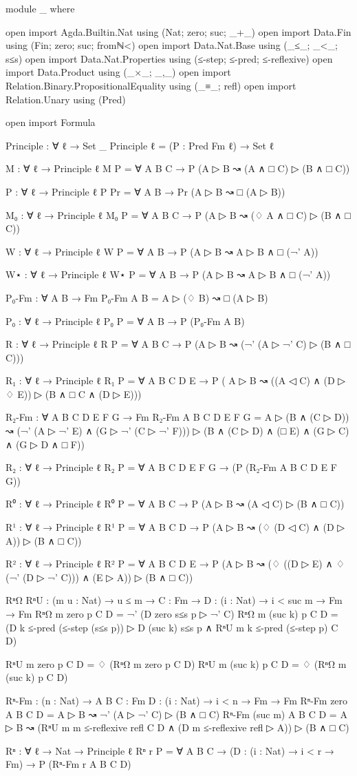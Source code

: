\begin{spverbatim}
module _ where

open import Agda.Builtin.Nat using (Nat; zero; suc; _+_)
open import Data.Fin using (Fin; zero; suc; fromℕ<)
open import Data.Nat.Base using (_≤_; _<_; s≤s)
open import Data.Nat.Properties using (≤-step; ≤-pred; ≤-reflexive)
open import Data.Product using (_×_; _,_)
open import Relation.Binary.PropositionalEquality using (_≡_; refl)
open import Relation.Unary using (Pred)

open import Formula

Principle : ∀ ℓ → Set _
Principle ℓ = (P : Pred Fm ℓ) → Set ℓ

M : ∀ {ℓ} → Principle ℓ
M P = ∀ {A B C} → P (A ▷ B ↝ (A ∧ □ C) ▷ (B ∧ □ C))

P : ∀ {ℓ} → Principle ℓ
P Pr = ∀ {A B} → Pr (A ▷ B ↝ □ (A ▷ B))

M₀ : ∀ {ℓ} → Principle ℓ
M₀ P = ∀ {A B C} → P (A ▷ B ↝ (♢ A ∧ □ C) ▷ (B ∧ □ C))

W : ∀ {ℓ} → Principle ℓ
W P = ∀ {A B} → P (A ▷ B ↝ A ▷ B ∧ □ (¬' A))

W⋆ : ∀ {ℓ} → Principle ℓ
W⋆ P = ∀ A B → P (A ▷ B ↝ A ▷ B ∧ □ (¬' A))

P₀-Fm : ∀ A B → Fm
P₀-Fm A B = A ▷ (♢ B) ↝ □ (A ▷ B)

P₀ : ∀ {ℓ} → Principle ℓ
P₀ P = ∀ {A B} → P (P₀-Fm A B)

R : ∀ {ℓ} → Principle ℓ
R P = ∀ {A B C} → P (A ▷ B ↝ (¬' (A ▷ ¬' C) ▷ (B ∧ □ C)))

R₁ : ∀ {ℓ} → Principle ℓ
R₁ P = ∀ {A B C D E} → P (
  A ▷ B ↝ ((A ◁ C) ∧ (D ▷ ♢ E)) ▷ (B ∧ □ C ∧ (D ▷ E)))

R₂-Fm : ∀ {A B C D E F G} → Fm
R₂-Fm {A} {B} {C} {D} {E} {F} {G} =
  A ▷ (B ∧ (C ▷ D)) ↝
  (¬' (A ▷ ¬' E) ∧ (G ▷ ¬' (C ▷ ¬' F)))
  ▷
  (B ∧ (C ▷ D) ∧ (□ E) ∧ (G ▷ C) ∧ (G ▷ D ∧ □ F))

R₂ : ∀ {ℓ} → Principle ℓ
R₂ P = ∀ {A B C D E F G} → (P (R₂-Fm {A} {B} {C} {D} {E} {F} {G}))

R⁰ : ∀ {ℓ} → Principle ℓ
R⁰ P = ∀ {A B C} → P (A ▷ B ↝ (A ◁ C) ▷ (B ∧ □ C))

R¹ : ∀ {ℓ} → Principle ℓ
R¹ P = ∀ {A B C D} → P (A ▷ B ↝ (♢ (D ◁ C) ∧ (D ▷ A)) ▷ (B ∧ □ C))

R² : ∀ {ℓ} → Principle ℓ
R² P = ∀ {A B C D E} → P (A ▷ B ↝ (♢ ((D ▷ E) ∧ ♢ (¬' (D ▷ ¬' C))) ∧ (E ▷ A)) ▷ (B ∧ □ C))

RⁿΩ RⁿU : (m u : Nat) → {u ≤ m} → {C : Fm} → {D : (i : Nat) → {i < suc m} → Fm} → Fm
RⁿΩ m zero {p} {C} {D} = ¬' (D zero {s≤s p} ▷ ¬' C)
RⁿΩ m (suc k) {p} {C} {D} = (D k {≤-pred (≤-step (s≤s p))} ▷ D (suc k) {s≤s p}
  ∧ RⁿU m k {≤-pred (≤-step p)} {C} {D})

RⁿU m zero {p} {C} {D} = ♢ (RⁿΩ m zero {p} {C} {D})
RⁿU m (suc k) {p} {C} {D} = ♢ (RⁿΩ m (suc k) {p} {C} {D})

Rⁿ-Fm : (n : Nat) → {A B C : Fm} {D : (i : Nat) → {i < n} → Fm} → Fm
Rⁿ-Fm zero {A} {B} {C} {D} = A ▷ B ↝ ¬' (A ▷ ¬' C) ▷ (B ∧ □ C)
Rⁿ-Fm (suc m) {A} {B} {C} {D} = A ▷ B ↝ (RⁿU m m {≤-reflexive refl} {C} {D} ∧ (D m {≤-reflexive refl} ▷ A)) ▷ (B ∧ □ C)

Rⁿ : ∀ {ℓ} → Nat → Principle ℓ
Rⁿ r P = ∀ {A B C} → (D : (i : Nat) → {i < r} → Fm) → P (Rⁿ-Fm r {A} {B} {C} {D})
\end{spverbatim}
